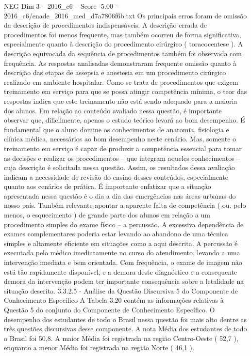 \begin{textsample}{NEG Dim 3 – 2016\_c6 – Score -5.00 – 2016\_c6/enade\_2016\_med\_d7a7806f6b.txt}
Os principais erros foram de omissão da descrição de procedimentos indispensáveis.
A descrição errada de procedimentos foi menos frequente, mas também ocorreu de forma significativa, especialmente quanto à descrição do procedimento cirúrgico ( toracocentese ).
A descrição equivocada da sequência de procedimentos também foi observada com frequência.
As respostas analisadas demonstraram frequente omissão quanto à descrição das etapas de assepsia e anestesia em um procedimento cirúrgico realizado em ambiente hospitalar.
Como se trata de procedimentos que exigem treinamento em serviço para que se possa atingir competência mínima, o teor das respostas indica que este treinamento não está sendo adequado para a maioria dos alunos.
Em relação ao conteúdo avaliado nessa questão, é importante observar que, dificilmente, apenas o estudo teórico levará ao bom desempenho.
É fundamental que o aluno domine os conhecimentos de anatomia, fisiologia e clínica médica, necessários ao bom desempenho neste cenário.
Mas, somente o treinamento em serviço é capaz de produzir a competência essencial para tomar as decisões e realizar os procedimentos – que integram aqueles conhecimentos – cuja descrição é solicitada nessa questão.
Assim, os resultados dessa avaliação indicam a necessidade de revisão do ensino desses conteúdos, especialmente quanto aos cenários de prática.
É importante enfatizar que a situação apresentada nessa questão é o dia a dia das emergências nas áreas urbanas do nosso país.
Também relevante apontar a aparente falta de competência ( ou, pelo menos, o esquecimento ) de grande parte dos alunos em relação a um procedimento simples do exame físico – a percussão.
A excessiva dependência de exames complementares poderia estar levando ao abandono de uma técnica simples e altamente eficiente em situações como a aqui descrita.
A percussão é executada pelo médico imediatamente no curso do atendimento, levando a uma intervenção imediata e bem orientada.
Com frequência, o exame de imagem não está tão rapidamente disponível, e a demora deste diagnóstico e a consequente demora da intervenção podem ter importante consequência sobre a letalidade na situação descrita. 3.3.2.5 - Análise da Questão Discursiva 5 do Componente de Conhecimento Específico A Tabela 3.20 contém as informações relativas à Questão 5 do conjunto do Componente de Conhecimento Específico.
O desempenho dos estudantes de todo o Brasil nessa questão foi mais alto dentre as três questões discursivas desse componente.
A nota Média dos estudantes de todo o Brasil foi 50,8.
A maior Média foi registrada na região Centro-Oeste ( 52,7 ), enquanto a menor Média foi registrada na região Norte ( 46,1 ).

\end{textsample}

